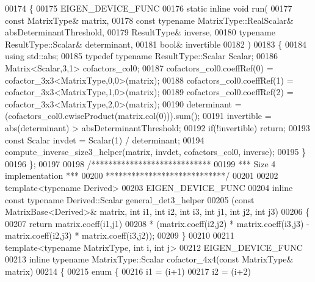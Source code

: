 \begin{DoxyCode}
00174 \{
00175   EIGEN\_DEVICE\_FUNC
00176   \textcolor{keyword}{static} \textcolor{keyword}{inline} \textcolor{keywordtype}{void} run(
00177     \textcolor{keyword}{const} MatrixType& matrix,
00178     \textcolor{keyword}{const} \textcolor{keyword}{typename} MatrixType::RealScalar& absDeterminantThreshold,
00179     ResultType& inverse,
00180     \textcolor{keyword}{typename} ResultType::Scalar& determinant,
00181     \textcolor{keywordtype}{bool}& invertible
00182   )
00183   \{
00184     \textcolor{keyword}{using} std::abs;
00185     \textcolor{keyword}{typedef} \textcolor{keyword}{typename} ResultType::Scalar Scalar;
00186     Matrix<Scalar,3,1> cofactors\_col0;
00187     cofactors\_col0.coeffRef(0) =  cofactor\_3x3<MatrixType,0,0>(matrix);
00188     cofactors\_col0.coeffRef(1) =  cofactor\_3x3<MatrixType,1,0>(matrix);
00189     cofactors\_col0.coeffRef(2) =  cofactor\_3x3<MatrixType,2,0>(matrix);
00190     determinant = (cofactors\_col0.cwiseProduct(matrix.col(0))).sum();
00191     invertible = abs(determinant) > absDeterminantThreshold;
00192     \textcolor{keywordflow}{if}(!invertible) \textcolor{keywordflow}{return};
00193     \textcolor{keyword}{const} Scalar invdet = Scalar(1) / determinant;
00194     compute\_inverse\_size3\_helper(matrix, invdet, cofactors\_col0, inverse);
00195   \}
00196 \};
00197 
00198 \textcolor{comment}{/****************************}
00199 \textcolor{comment}{*** Size 4 implementation ***}
00200 \textcolor{comment}{****************************/}
00201 
00202 \textcolor{keyword}{template}<\textcolor{keyword}{typename} Derived>
00203 EIGEN\_DEVICE\_FUNC 
00204 \textcolor{keyword}{inline} \textcolor{keyword}{const} \textcolor{keyword}{typename} Derived::Scalar general\_det3\_helper
00205 (\textcolor{keyword}{const} MatrixBase<Derived>& matrix, \textcolor{keywordtype}{int} i1, \textcolor{keywordtype}{int} i2, \textcolor{keywordtype}{int} i3, \textcolor{keywordtype}{int} j1, \textcolor{keywordtype}{int} j2, \textcolor{keywordtype}{int} j3)
00206 \{
00207   \textcolor{keywordflow}{return} matrix.coeff(i1,j1)
00208          * (matrix.coeff(i2,j2) * matrix.coeff(i3,j3) - matrix.coeff(i2,j3) * matrix.coeff(i3,j2));
00209 \}
00210 
00211 \textcolor{keyword}{template}<\textcolor{keyword}{typename} MatrixType, \textcolor{keywordtype}{int} i, \textcolor{keywordtype}{int} j>
00212 EIGEN\_DEVICE\_FUNC 
00213 \textcolor{keyword}{inline} \textcolor{keyword}{typename} MatrixType::Scalar cofactor\_4x4(\textcolor{keyword}{const} MatrixType& matrix)
00214 \{
00215   \textcolor{keyword}{enum} \{
00216     i1 = (i+1) %
00217     i2 = (i+2) %

\end{DoxyCode}
